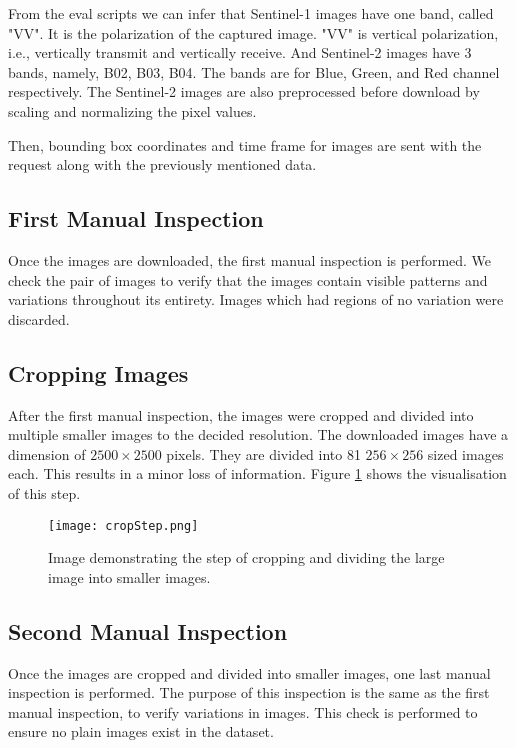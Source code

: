 From the eval scripts we can infer that Sentinel-1 images have one band, called "VV". It is the polarization of the captured image. "VV" is vertical polarization, i.e.,  vertically transmit and vertically receive. And Sentinel-2 images have 3 bands, namely, B02, B03, B04. The bands are for Blue, Green, and Red channel respectively. The Sentinel-2 images are also preprocessed before download by scaling and normalizing the pixel values. 

Then, bounding box coordinates and time frame for images are sent with the request along with the previously mentioned data.

\subsection{First Manual Inspection}

Once the images are downloaded, the first manual inspection is performed. We check the pair of images to verify that the images contain visible patterns and variations throughout its entirety. Images which had regions of no variation were discarded.

\subsection{Cropping Images}

After the first manual inspection, the images were cropped and divided into multiple smaller images to the decided resolution. The downloaded images have a dimension of $2500\times2500$ pixels. They are divided into 81 $256\times256$ sized images each. This results in a minor loss of information. Figure \ref{fig:cropStep} shows the visualisation of this step.

\begin{figure}[h]
    \texttt{[image: cropStep.png]}
    \caption{Image demonstrating the step of cropping and dividing the large image into smaller images.}
    \label{fig:cropStep}
\end{figure}

\subsection{Second Manual Inspection}

Once the images are cropped and divided into smaller images, one last manual inspection is performed. The purpose of this inspection is the same as the first manual inspection, to verify variations in images. This check is performed to ensure no plain images exist in the dataset.

